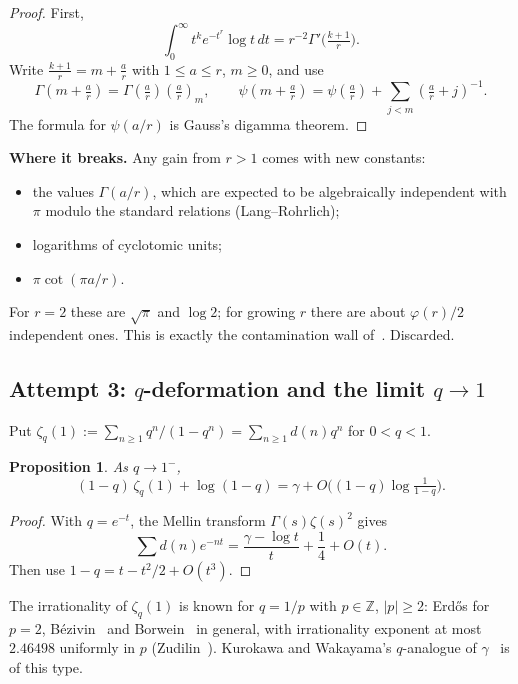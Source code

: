 \documentclass[11pt,a4paper]{article}
\newtheorem{proposition}[theorem]{Proposition}
\theoremstyle{definition}
\theoremstyle{remark}
\newcommand{\Z}{\mathbb Z}
\numberwithin{equation}{section}
\begin{document}
\begin{proof}
First,
\[
\int_0^\infty t^ke^{-t^r}\log t\,dt=r^{-2}\Gamma'\bigl(\tfrac{k+1}r\bigr).
\]
Write $\frac{k+1}r=m+\frac ar$ with $1\le a\le r$, $m\ge0$, and use
\[
\Gamma(m+\tfrac ar)=\Gamma(\tfrac ar)(\tfrac ar)_m,\qquad
\psi(m+\tfrac ar)=\psi(\tfrac ar)+\sum_{j<m}(\tfrac ar+j)^{-1}.
\]
The formula for $\psi(a/r)$ is Gauss's digamma theorem.
\end{proof}

\noindent\textbf{Where it breaks.} Any gain from $r>1$ comes with new constants:
\begin{itemize}[leftmargin=2em]
\item the values $\Gamma(a/r)$, which are expected to be algebraically independent with $\pi$ modulo the standard relations (Lang--Rohrlich);
\item logarithms of cyclotomic units;
\item $\pi\cot(\pi a/r)$.
\end{itemize}
For $r=2$ these are $\sqrt\pi$ and $\log2$; for growing $r$ there are about $\varphi(r)/2$ independent ones. This is exactly the contamination wall of~\cite{p4:K2,p4:K3}. Discarded.

\subsection{\texorpdfstring{Attempt 3: $q$-deformation and the limit $q\to1$}{Attempt 3: q-deformation and the limit q -> 1}}

Put $\zeta_q(1):=\sum_{n\ge1}q^n/(1-q^n)=\sum_{n\ge1}d(n)q^n$ for $0<q<1$.

\begin{proposition}\label{p4:prop:q}
As $q\to1^-$,
\[
(1-q)\,\zeta_q(1)+\log(1-q)=\gamma+O\bigl((1-q)\log\tfrac1{1-q}\bigr).
\]
\end{proposition}

\begin{proof}
With $q=e^{-t}$, the Mellin transform $\Gamma(s)\zeta(s)^2$ gives
\[
\sum d(n)e^{-nt}=\frac{\gamma-\log t}t+\frac14+O(t).
\]
Then use $1-q=t-t^2/2+O(t^3)$.
\end{proof}

The irrationality of $\zeta_q(1)$ is known for $q=1/p$ with $p\in\Z$, $|p|\ge2$: Erd\H{o}s for $p=2$, B\'ezivin~\cite{p4:Bez} and Borwein~\cite{p4:Bor} in general, with irrationality exponent at most $2.46498$ uniformly in $p$ (Zudilin~\cite{p4:Zud}). Kurokawa and Wakayama's $q$-analogue of $\gamma$~\cite{p4:KW} is of this type.
\end{document}
